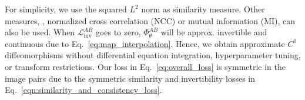For simplicity, we use the squared $L^2$ norm as similarity measure. Other measures, \eg, normalized cross correlation (NCC) or mutual information (MI), can also be used. When $\mathcal{L}_{\text{inv}}^{AB}$ goes to zero, $\Phi_\theta^{AB}$ will be approx. invertible and continuous due to Eq.~\eqref{eq:map_interpolation}. Hence, we obtain approximate $C^0$ diffeomorphisms without  differential equation integration,  hyperparameter tuning, or transform restrictions. Our loss in Eq.~\eqref{eq:overall_loss} is symmetric in the image pairs due to the symmetric similarity and invertibility losses in Eq.~\eqref{eqn:similarity_and_consistency_loss}.





%

